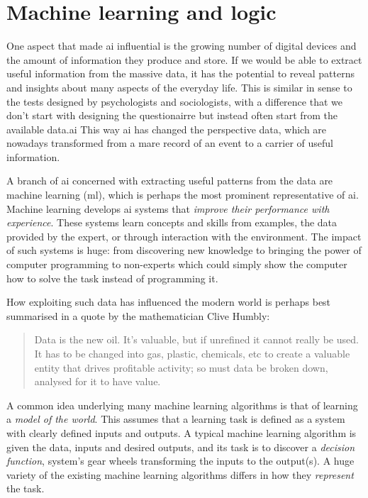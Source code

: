\section{Machine learning and logic}
\label{sec:intro_ml}


One aspect that made \gls{ai} influential is the growing number of digital devices and the amount of information they produce and store.
If we would be able to extract useful information from the massive data, it has the potential to reveal patterns and insights about many aspects of the everyday life.
This is similar in sense to the tests designed by psychologists and sociologists, with a difference that we don't start with designing the questionairre but instead  often start from the available data.\gls{ai}
This way \gls{ai} has changed the perspective data, which are nowadays transformed from a mare record of an event to a carrier of useful information.


A branch of \gls{ai} concerned with extracting useful patterns from the data are machine learning (\gls{ml}), which is perhaps the most prominent representative of \gls{ai}.
Machine learning develops \gls{ai} systems that \textit{improve their performance with experience}.
These systems learn concepts and skills from examples, the data provided by the expert, or through interaction with the environment.
The impact of such systems is huge: from discovering new knowledge to bringing the power of computer programming to non-experts which could simply show the computer how to solve the task instead of programming it.



How exploiting such data has influenced the modern world is perhaps best summarised  in a quote by the mathematician Clive Humbly:
\begin{quote}
	Data is the new oil. It’s valuable, but if unrefined it cannot really be used. It has to be changed into gas, plastic, chemicals, etc to create a valuable entity that drives profitable activity; so must data be broken down, analysed for it to have value.
\end{quote}




A common idea underlying many machine learning algorithms is that of learning a \textit{model of the world}. 
This assumes that a learning task is defined as a system with clearly defined inputs and outputs.
A typical machine learning algorithm is given the data, inputs and desired outputs, and its task is to discover a \textit{decision function}, system's gear wheels transforming the inputs to the output(s).
A huge variety of the existing machine learning algorithms differs in how they \textit{represent} the task.



